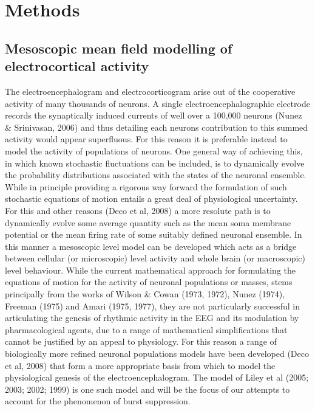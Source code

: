 \documentclass[a4paper,12pt]{article}
\begin{document}
\section{Methods}
\subsection{Mesoscopic mean field modelling of electrocortical activity}
The electroencephalogram and electrocorticogram arise out of the
cooperative activity of many thousands of neurons. A single
electroencephalographic electrode records the synaptically induced
currents of well over a 100,000 neurons (Nunez \& Srinivasan, 2006)
and thus detailing each neurons contribution to this summed activity
would appear superfluous. For this reason it is preferable instead to
model the activity of populations of neurons. One general way of
achieving this, in which known stochastic fluctuations can be included,
is to dynamically evolve the probability distributions associated with
the states of the neuronal ensemble. While in principle providing a
rigorous way forward the formulation of such stochastic equations of
motion entails a great deal of physiological uncertainty. For this and
other reasons (Deco et al, 2008) a more resolute path is to
dynamically evolve some average quantity such as the mean soma
membrane potential or the mean firing rate of some suitably defined
neuronal ensemble. In this manner a mesoscopic level model can be
developed which acts as a bridge between cellular (or microscopic)
level activity and whole brain (or macroscopic) level behaviour.
While the current mathematical approach for formulating the equations
of motion for the activity of neuronal populations or masses, stems
principally from the works of Wilson \& Cowan (1973, 1972), Nunez
(1974), Freeman (1975) and Amari (1975, 1977), they are not
particularly successful in articulating the genesis of rhythmic activity in
the EEG and its modulation by pharmacological agents, due to a range
of mathematical simplifications that cannot be justified by an appeal to
physiology. For this reason a range of biologically more refined
neuronal populations models have been developed (Deco et al, 2008)
that form a more appropriate basis from which to model the
physiological genesis of the electroencephalogram. The model of Liley
et al (2005; 2003; 2002; 1999) is one such model and will be the
focus of our attempts to account for the phenomenon of burst
suppression.
\end{document}
